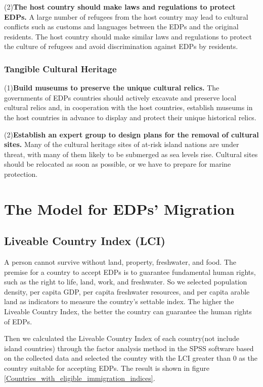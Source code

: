 \documentclass[12pt]{article}  %
\begin{document}
(2)\textbf{The host country should make laws and regulations to protect EDPs.} A large number of refugees from the host country may lead to cultural conflicts such as customs and languages between the EDPs and the original residents. The host country should make similar laws and regulations to protect the culture of refugees and avoid discrimination against EDPs by residents.







\subsubsection{Tangible Cultural Heritage}

(1)\textbf{Build museums to preserve the unique cultural relics.} The governments of EDPs countries should actively excavate and preserve local cultural relics and, in cooperation with the host countries, establish museums in the host countries in advance to display and protect their unique historical relics.



(2)\textbf{Establish an expert group to design plans for the removal of cultural sites.} Many of the cultural heritage sites of at-risk island nations are under threat, with many of them likely to be submerged as sea levels rise. Cultural sites should be relocated as soon as possible, or we have to prepare for marine protection. 




\section{The Model for EDPs’ Migration}

\subsection{Liveable Country Index (LCI)}
A person cannot survive without land, property, freshwater, and food. The premise for a country to accept EDPs is to guarantee fundamental human rights, such as the right to life, land, work, and freshwater. So we selected population density, per capita GDP, per capita freshwater resources, and per capita arable land as indicators to measure the country's settable index. The higher the Liveable Country Index, the better the country can guarantee the human rights of EDPs.

Then we calculated the Liveable Country Index of each country(not include island countries) through the factor analysis method in the SPSS software based on the collected data and selected the country with the LCI greater than 0 as the country suitable for accepting EDPs. The result is shown in figure \ref{Countries_with_eligible_immigration_indices}.
\end{document}
